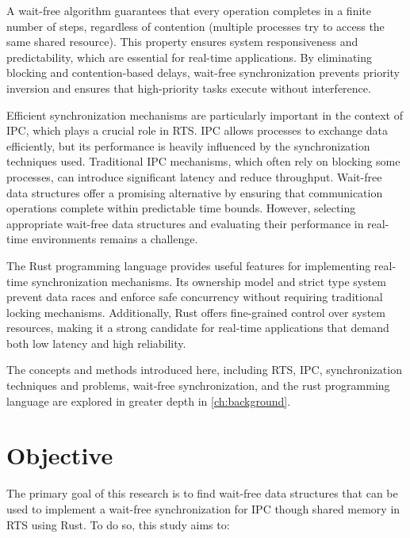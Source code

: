 A wait-free algorithm guarantees that every operation completes in a finite number of steps, regardless of contention (multiple processes try to access the same shared resource). This property ensures system responsiveness and predictability, which are essential for real-time applications. By eliminating blocking and contention-based delays, wait-free synchronization prevents priority inversion and ensures that high-priority tasks execute without interference. \cite{kogan2012methodology, herlihy1991wait, brandenburg2019multiprocessorrealtimelockingprotocols}

Efficient synchronization mechanisms are particularly important in the context of \ac{IPC}, which plays a crucial role in \ac{RTS}. \ac{IPC} allows processes to exchange data efficiently, but its performance is heavily influenced by the synchronization techniques used. Traditional \ac{IPC} mechanisms, which often rely on blocking some processes, can introduce significant latency and reduce throughput. Wait-free data structures offer a promising alternative by ensuring that communication operations complete within predictable time bounds. However, selecting appropriate wait-free data structures and evaluating their performance in real-time environments remains a challenge. \cite{timnat2014practical, michael1996simple, huang2002improvingWaitFree, pellegrini2020relevancewaitfreecoordinationalgorithms}

The Rust programming language provides useful features for implementing real-time synchronization mechanisms. Its ownership model and strict type system prevent data races and enforce safe concurrency without requiring traditional locking mechanisms. Additionally, Rust offers fine-grained control over system resources, making it a strong candidate for real-time applications that demand both low latency and high reliability. \cite{xu2023rust, sharma2024rustembeddedsystemscurrent}

The concepts and methods introduced here, including \ac{RTS}, \ac{IPC}, synchronization techniques and problems, wait-free synchronization, and the rust programming language are explored in greater depth in \cref{ch:background}. 

\section{Objective}\label{sec:objective}

The primary goal of this research is to find wait-free data structures that can be used to implement a wait-free synchronization for \ac{IPC} though shared memory in \ac{RTS} using Rust. To do so, this study aims to:

